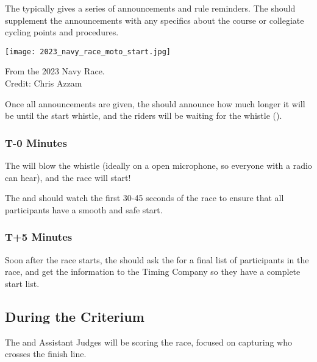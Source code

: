 The  typically gives a series of announcements and rule reminders.
The  should supplement the announcements with any specifics about the course or collegiate cycling points and procedures.

\begin{marginfigure}
  \texttt{[image: 2023\_navy\_race\_moto\_start.jpg]}
  \caption[Motorcycle referee starting a race]{From the 2023 Navy Race.\\
            Credit: Chris Azzam}
\end{marginfigure}

Once all announcements are given, the  should announce how much longer it will be until the start whistle,
and the riders will be waiting for the whistle ().

\subsubsection{T-0 Minutes}

The  will blow the whistle (ideally on a open microphone, so everyone with a radio can hear),
and the race will start!

The  and  should watch the first 30-45 seconds of the race
to ensure that all participants have a smooth and safe start.

\subsubsection{T+5 Minutes}

Soon after the race starts, the  should ask the  for a final list of
participants in the race, and get the information to the Timing Company so they have a complete start list.

\subsection{During the Criterium}

The  and Assistant Judges will be scoring the race, focused on capturing who crosses the finish line.

